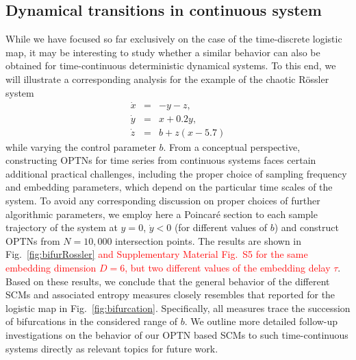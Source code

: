 \documentclass[aip,cha,reprint,nofootinbib]{revtex4-1}
\begin{document}
\subsection{Dynamical transitions in continuous system}\label{sec:cont}

While we have focused so far exclusively on the case of the time-discrete logistic map, it may be interesting to study whether a similar behavior can also be obtained for time-continuous deterministic dynamical systems. To this end, we will illustrate a corresponding analysis for the example of the chaotic R\"ossler system \cite{Roessler1976} 
\begin{eqnarray}
\dot{x} &=& -y-z, \nonumber \\
\dot{y} &=& x+0.2y, \\
\dot{z} &=& b+z(x-5.7) \nonumber
\end{eqnarray}
while varying the control parameter $b$. From a conceptual perspective, constructing OPTNs for time series from continuous systems faces certain additional practical challenges, including the proper choice of sampling frequency and embedding parameters, which depend on the particular time scales of the system. To avoid any corresponding discussion on proper choices of further algorithmic parameters, we employ here a Poincar\'e section to each sample trajectory of the system at $y=0$, $\dot{y}<0$ (for different values of $b$) and construct OPTNs from $N = 10,000$ intersection points. The results are shown in Fig.~\ref{fig:bifurRossler} \textcolor{red}{and Supplementary Material Fig.~S5 for the same embedding dimension $D=6$, but two different values of the embedding delay $\tau$}. Based on these results, we conclude that the general behavior of the different SCMs and associated entropy measures closely resembles that reported for the logistic map in Fig.~\ref{fig:bifurcation}. Specifically, all measures trace the succession of bifurcations in the considered range of $b$. We outline more detailed follow-up investigations on the behavior of our OPTN based SCMs to such time-continuous systems directly as relevant topics for future work.
\end{document}
